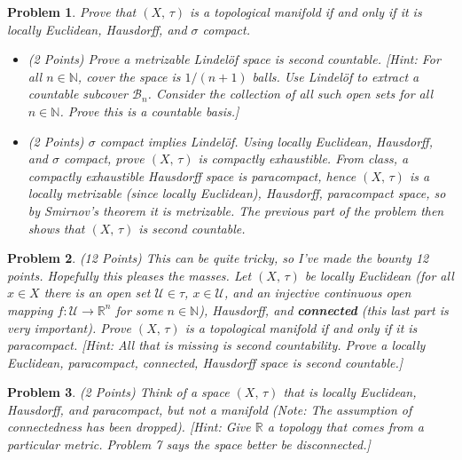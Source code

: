 \documentclass{article}
\theoremstyle{normal}
\newtheorem{problem}{Problem}
\begin{document}
    \begin{problem}
        Prove that $(X,\,\tau)$ is a topological manifold if and only if
        it is locally Euclidean, Hausdorff, and $\sigma$ compact.
        \begin{itemize}
            \item (2 Points) Prove a metrizable Lindel\"{o}f space is
                second countable. [Hint: For all $n\in\mathbb{N}$, cover the
                space is $1/(n+1)$ balls. Use Lindel\"{o}f to extract a
                countable subcover $\mathcal{B}_{n}$. Consider the collection
                of all such open sets for all $n\in\mathbb{N}$. Prove this is
                a countable basis.]
            \item (2 Points) $\sigma$ compact implies Lindel\"{o}f. Using
                locally Euclidean, Hausdorff, and $\sigma$ compact, prove
                $(X,\,\tau)$ is compactly exhaustible. From class, a
                compactly exhaustible Hausdorff space is paracompact, hence
                $(X,\,\tau)$ is a locally metrizable (since locally Euclidean),
                Hausdorff, paracompact space, so by Smirnov's theorem it is
                metrizable. The previous part of the problem then shows that
                $(X,\,\tau)$ is second countable.
        \end{itemize}
    \end{problem}
    \begin{problem}
        (12 Points) This can be quite tricky, so I've made the bounty 12 points.
        Hopefully this pleases the masses. Let $(X,\,\tau)$ be locally
        Euclidean (for all $x\in{X}$ there is an open set
        $\mathcal{U}\in\tau$, $x\in\mathcal{U}$, and an injective continuous
        open mapping $f:\mathcal{U}\rightarrow\mathbb{R}^{n}$
        for some $n\in\mathbb{N}$), Hausdorff, and \textbf{connected}
        (this last part is very important). Prove $(X,\,\tau)$ is a
        topological manifold if and only if it is paracompact.
        [Hint: All that is missing is second countability. Prove a
        locally Euclidean, paracompact, connected, Hausdorff space is second
        countable.]
    \end{problem}
    \begin{problem}
        (2 Points) Think of a space $(X,\,\tau)$ that is locally Euclidean,
        Hausdorff, and paracompact, but not a manifold
        (Note: The assumption of connectedness has been dropped).
        [Hint: Give $\mathbb{R}$ a topology that comes from a
        particular metric. Problem 7 says the space better be disconnected.]
    \end{problem}
\end{document}
